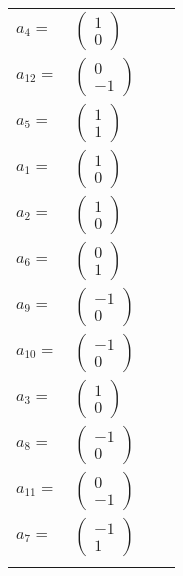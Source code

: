 \documentclass[1p]{elsarticle_modified}
\theoremstyle{definition}
\begin{document}
\begin{tabular}{m{7pt} m{180pt} m{7pt} m{180pt} }
\flushright $a_{4}=$&$\begin{pmatrix}1\\0\end{pmatrix}$ \\
\flushright $a_{12}=$&$\begin{pmatrix}0\\-1\end{pmatrix}$ \\
\flushright $a_{5}=$&$\begin{pmatrix}1\\1\end{pmatrix}$ \\
\flushright $a_{1}=$&$\begin{pmatrix}1\\0\end{pmatrix}$ \\
\flushright $a_{2}=$&$\begin{pmatrix}1\\0\end{pmatrix}$ \\
\flushright $a_{6}=$&$\begin{pmatrix}0\\1\end{pmatrix}$ \\
\flushright $a_{9}=$&$\begin{pmatrix}-1\\0\end{pmatrix}$ \\
\flushright $a_{10}=$&$\begin{pmatrix}-1\\0\end{pmatrix}$ \\
\flushright $a_{3}=$&$\begin{pmatrix}1\\0\end{pmatrix}$ \\
\flushright $a_{8}=$&$\begin{pmatrix}-1\\0\end{pmatrix}$ \\
\flushright $a_{11}=$&$\begin{pmatrix}0\\-1\end{pmatrix}$ \\
\flushright $a_{7}=$&$\begin{pmatrix}-1\\1\end{pmatrix}$\\&\end{tabular}
\end{document}
